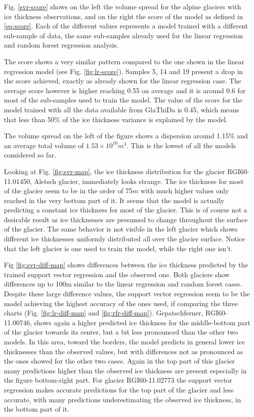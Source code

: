 Fig. \ref{svr-score} shows on the left the volume spread for the alpine glaciers with ice thickness observations, and on the right the score of the model as defined in \ref{eq:score}. Each of the different values represents a model trained with a different sub-sample of data, the same sub-samples already used for the linear regression and random forest regression analysis.

The score shows a very similar pattern compared to the one shown in the linear regression model (see Fig. \ref{fig:lr-score}). Samples 5, 14 and 19 present a drop in the score achieved, exactly as already shown for the linear regression case. The average score however is higher reaching 0.55 on average and it is around 0.6 for most of the sub-samples used to train the model.
The value of the score for the model trained with all the data available from GlaThiDa is 0.45, which means that less than 50\% of the ice thickness variance is explained by the model. 

The volume spread on the left of the figure shows a dispersion around 1.15\% and an average total volume of $1.53 \times 10^{10}m^3$. This is the lowest of all the models considered so far. 

Looking at Fig. \ref{fig:svr-map}, the ice thickness distribution for the glacier RGI60-11.01450, Aletsch glacier, immediately looks strange. The ice thickness for most of the glacier seem to be in the order of 75$m$ with much higher values only reached in the very bottom part of it. It seems that the model is actually predicting a constant ice thickness for most of the glacier. This is of course not a desirable result as ice thicknesses are presumed to change throughout the surface of the glacier. The same behavior is not visible in the left glacier which shows different ice thicknesses uniformly distributed all over the glacier surface. Notice that the left glacier is one used to train the model, while the right one isn't.

Fig \ref{fig:svr-diff-map} shows differences between the ice thickness predicted by the trained support vector regression and the observed one. Both glaciers show differences up to 100m similar to the linear regression and random forest cases. Despite these large difference values, the support vector regression seem to be the model achieving the highest accuracy of the ones used, if comparing the three charts (Fig. \ref{fig:lr-diff-map} and \ref{fig:rfr-diff-map}). Gepatschferner, RGI60-11.00746, shows again a higher predicted ice thickness for the middle-bottom part of the glacier towards its center, but a bit less pronounced than the other two models. In this area, toward the borders, the model predicts in general lower ice thicknesses than the observed values, but with differences not as pronounced as the ones showed for the other two cases. Again in the top part of this glacier many predictions higher than the observed ice thickness are present especially in the figure bottom-right part. For glacier RGI60-11.02773 the support vector regression makes accurate predictions for the top part of the glacier and less accurate, with many predictions underestimating the observed ice thickness, in the bottom part of it. 

